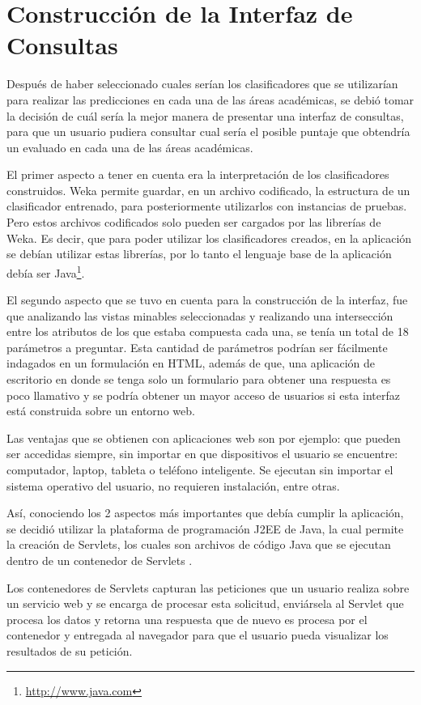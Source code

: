 \chapter{Construcción de la Interfaz de Consultas}
Después de haber seleccionado cuales serían los clasificadores que se utilizarían para realizar las predicciones en cada una de las áreas académicas, se debió tomar la decisión de cuál sería la mejor manera de presentar una interfaz de consultas, para que un usuario pudiera consultar cual sería el posible puntaje que obtendría un evaluado en cada una de las áreas académicas.

El primer aspecto a tener en cuenta era la interpretación de los clasificadores construidos. Weka permite guardar, en un archivo codificado, la estructura de un clasificador entrenado, para posteriormente utilizarlos con instancias de pruebas. Pero estos archivos codificados solo pueden ser cargados por las librerías de Weka. Es decir, que para poder utilizar los clasificadores creados, en la aplicación se debían utilizar estas librerías, por lo tanto el lenguaje base de la aplicación debía ser Java\footnote{\url{http://www.java.com}}.

El segundo aspecto que se tuvo en cuenta para la construcción de la interfaz, fue que analizando las vistas minables seleccionadas y realizando una intersección entre los atributos de los que estaba compuesta cada una, se tenía un total de 18 parámetros a preguntar. Esta cantidad de parámetros podrían ser fácilmente indagados en un formulación en HTML, además de que, una aplicación de escritorio en donde se tenga solo un formulario para obtener una respuesta es poco llamativo y se podría obtener un mayor acceso de usuarios si esta interfaz está construida sobre un entorno web.

Las ventajas que se obtienen con aplicaciones web son por ejemplo: que pueden ser accedidas siempre, sin importar en que dispositivos el usuario se encuentre: computador, laptop, tableta o teléfono inteligente. Se ejecutan sin importar el sistema operativo del usuario, no requieren instalación, entre otras.

Así, conociendo los 2 aspectos más importantes que debía cumplir la aplicación, se decidió utilizar la plataforma de programación J2EE de Java, la cual permite la creación de Servlets, los cuales son archivos de código Java que se ejecutan dentro de un contenedor de Servlets \cite{key-260}.

Los contenedores de Servlets capturan las peticiones que un usuario realiza sobre un servicio web y se encarga de procesar esta solicitud, enviársela al Servlet que procesa los datos y retorna una respuesta que de nuevo es procesa por el contenedor y entregada al navegador para que el usuario pueda visualizar los resultados de su petición.

